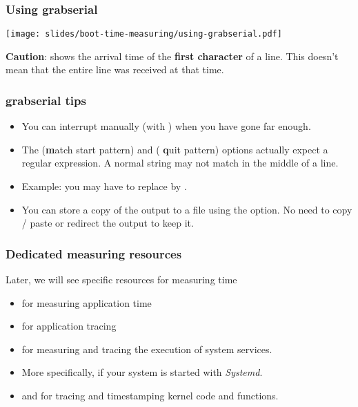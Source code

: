 \begin{frame}
\frametitle{Using grabserial}
\begin{center}
    \texttt{[image: slides/boot-time-measuring/using-grabserial.pdf]}
\end{center}
{\small
{\bf Caution}:  shows the arrival time of the
{\bf first character} of a line. This doesn't mean that the entire line
was received at that time.}
\end{frame}

\begin{frame}
\frametitle{grabserial tips}
\begin{itemize}
  \item You can interrupt  manually (with
  \code{[Ctrl][c]}) when you have gone far enough.
  \item The  ({\bf m}atch start pattern) and  ({\bf
  q}uit pattern) options actually expect a regular expression.
  A normal string may not match in the middle of a line.
  \item Example: you may have to replace  by
  .
  \item You can store a copy of the output to a file using the 
        option. No need to copy / paste or redirect the output to keep it.
\end{itemize}
\end{frame}

\begin{frame}
\frametitle{Dedicated measuring resources}
Later, we will see specific resources for measuring time
\begin{itemize}
  \item {} for measuring application time
  \item {} for application tracing
  \item {} for measuring and tracing the execution of system services.
  \item More specifically,  if your system
	is started with {\em Systemd}.
  \item {} and  for
        tracing and timestamping kernel code and functions.
\end{itemize}
\end{frame}

